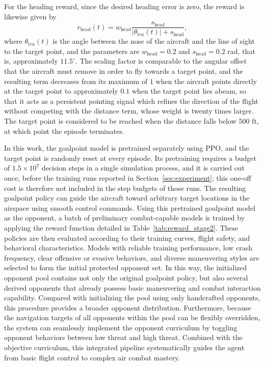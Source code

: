 \documentclass[pdflatex,sn-mathphys-num]{sn-jnl}%
\theoremstyle{thmstyleone}%
\theoremstyle{thmstyletwo}%
\theoremstyle{thmstylethree}%
\begin{document}
For the heading reward, since the desired heading error is zero, the reward is likewise given by
\begin{equation}
    r_{\mathrm{head}}(t) = w_{\mathrm{head}}\frac{s_{\mathrm{head}}}{|\theta_{tra}(t)| + s_{\mathrm{head}}},
    \label{eq:goalpoint_head}
\end{equation}
where $\theta_{tra}(t)$ is the angle between the nose of the aircraft and the line of sight to the target point, and the parameters are $w_{\mathrm{head}} = 0.2$ and $s_{\mathrm{head}} = 0.2$ rad, that is, approximately $11.5^\circ$. The scaling factor is comparable to the angular offset that the aircraft must remove in order to fly towards a target point, and the resulting term decreases from its maximum of $1$ when the aircraft points directly at the target point to approximately $0.1$ when the target point lies abeam, so that it acts as a persistent pointing signal which refines the direction of the flight without competing with the distance term, whose weight is twenty times larger. The target point is considered to be reached when the distance falls below $500$ ft, at which point the episode terminates.

In this work, the goalpoint model is pretrained separately using PPO, and the target point is randomly reset at every episode. Its pretraining requires a budget of $1.5\times10^{7}$ decision steps in a single simulation process, and it is carried out once, before the training runs reported in Section~\ref{sec:experiment}; this one-off cost is therefore not included in the step budgets of those runs. The resulting goalpoint policy can guide the aircraft toward arbitrary target locations in the airspace using smooth control commands. Using this pretrained goalpoint model as the opponent, a batch of preliminary combat-capable models is trained by applying the reward function detailed in Table~\ref{tab:reward_stage2}. These policies are then evaluated according to their training curves, flight safety, and behavioral characteristics. Models with reliable training performance, low crash frequency, clear offensive or evasive behaviors, and diverse maneuvering styles are selected to form the initial protected opponent set. In this way, the initialized opponent pool contains not only the original goalpoint policy, but also several derived opponents that already possess basic maneuvering and combat interaction capability. Compared with initializing the pool using only handcrafted opponents, this procedure provides a broader opponent distribution. Furthermore, because the navigation targets of all opponents within the pool can be flexibly overridden, the system can seamlessly implement the opponent curriculum by toggling opponent behaviors between low threat and high threat. Combined with the objective curriculum, this integrated pipeline systematically guides the agent from basic flight control to complex air combat mastery.
\end{document}
